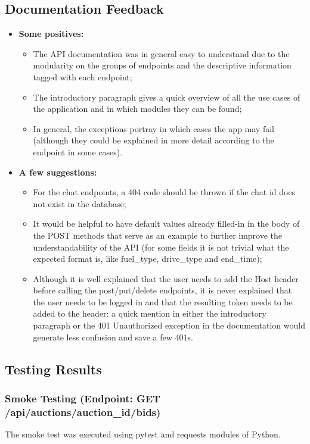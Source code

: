 \documentclass[11pt,a4paper]{article}
\begin{document}
\subsection*{Documentation Feedback}
\begin{itemize}
    \item \textbf{Some positives:}
    \begin{itemize}
        \item The API documentation was in general easy to understand due to the modularity on the groups of endpoints and the descriptive information tagged with each endpoint;
        \item The introductory paragraph gives a quick overview of all the use cases of the application and in which modules they can be found;
        \item In general, the exceptions portray in which cases the app may fail (although they could be explained in more detail according to the endpoint in some cases).
    \end{itemize}
    \item \textbf{A few suggestions:}
    \begin{itemize}
        \item For the chat endpoints, a 404 code should be thrown if the chat id does not exist in the database;
        \item It would be helpful to have default values already filled-in in the body of the POST methods that serve as an example to further improve the understandability of the API (for some fields it is not trivial what the expected format is, like fuel\_type, drive\_type and end\_time);
        \item Although it is well explained that the user needs to add the Host header before calling the post/put/delete endpoints, it is never explained that the user needs to be logged in and that the resulting token needs to be added to the header: a quick mention in either the introductory paragraph or the 401 Unauthorized exception in the documentation would generate less confusion and save a few 401s.
    \end{itemize}
\end{itemize}

\subsection*{Testing Results}

\subsubsection*{Smoke Testing (Endpoint: GET /api/auctions/{auction\_id}/bids)}
The smoke test was executed using pytest and requests modules of Python.
\end{document}
